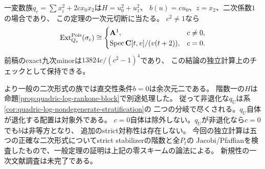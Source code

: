 \begin{corollary}[一変数の直交性wall]\label{cor:quadric-resonant-log-wall}
一変数族$q_c=\sum x_i^2+2cx_0x_2$は$H=u_0^2+u_1^2$、
$b(u)=cu_0$、$z=x_2$、二次係数$1$の場合であり、
この定理の一次元切断に当たる。
$c^2\ne1$なら
\[
\operatorname{Ext}^{\mathrm{Pois}}_{Q_c}(\sigma_c)\cong
\begin{cases}\mathbf A^1,&c\ne0,\\
\operatorname{Spec}\mathbf C[t,v]/(v(t+2)),&c=0.
\end{cases}
\]
前稿のexact九次minorは$13824c/(c^2-1)^4$であり、
この結論の独立計算上のチェックとして保持できる。
\end{corollary}
\begin{remark}
より一般の二次形式の族では直交性条件$b=0$は余次元二である。
階数一の$H$は命題\ref{prop:quadric-log-rankone-block}で別途処理した。
従って非退化な$q_U$は系\ref{cor:quadric-log-nondegenerate-stratification}の
二つの分岐で尽くされる。$q_U$自体が退化する配置は対象外である。
$c=0$自体は除外しない。$q_U$が非退化なら$c=0$でも$b$は非等方となり、
追加のstrict対称性は存在しない。
今回の独立計算は五つの正確な二次形式についてstrict stabilizerの階数と全$P_t$の
Jacobi/Pfaffianを検査したもので、一般定理の証明は上記の零スキームの論法による。
新規性の一次文献調査は未完了である。
\end{remark}
